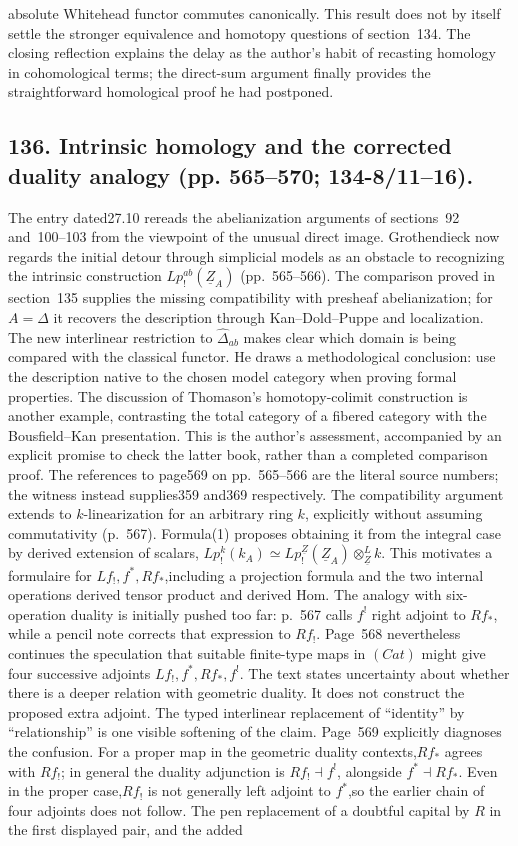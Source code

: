 \documentclass[10pt,oneside]{book}
\begin{document}
absolute Whitehead functor commutes canonically. This result does not by itself settle the stronger equivalence and homotopy questions of section~134. The closing reflection explains the delay as the author's habit of recasting homology in cohomological terms; the direct-sum argument finally provides the straightforward homological proof he had postponed.

\subsection*{136. Intrinsic homology and the corrected duality analogy (pp. 565--570; 134-8/11--16).}
The entry dated27.10 rereads the abelianization arguments of sections~92 and~100--103 from the viewpoint of the unusual direct image. Grothendieck now regards the initial detour through simplicial models as an obstacle to recognizing the intrinsic construction $Lp^{ab}_{!}(\underline Z_A)$ (pp.~565--566). The comparison proved in section~135 supplies the missing compatibility with presheaf abelianization; for $A=\Delta$ it recovers the description through Kan--Dold--Puppe and localization. The new interlinear restriction to $\widehat\Delta_{ab}$ makes clear which domain is being compared with the classical functor. He draws a methodological conclusion: use the description native to the chosen model category when proving formal properties. The discussion of Thomason's homotopy-colimit construction is another example, contrasting the total category of a fibered category with the Bousfield--Kan presentation. This is the author's assessment, accompanied by an explicit promise to check the latter book, rather than a completed comparison proof. The references to page569 on pp.~565--566 are the literal source numbers; the witness instead supplies359 and369 respectively. The compatibility argument extends to $k$-linearization for an arbitrary ring $k$, explicitly without assuming commutativity (p.~567). Formula(1) proposes obtaining it from the integral case by derived extension of scalars, $Lp^k_{!}(k_A)\simeq Lp^{\underline Z}_{!}(\underline Z_A)\otimes^{L}_{\underline Z}k$. This motivates a formulaire for $Lf_{!},f^*,Rf_*$,including a projection formula and the two internal operations derived tensor product and derived Hom. The analogy with six-operation duality is initially pushed too far: p.~567 calls $f^!$ right adjoint to $Rf_*$, while a pencil note corrects that expression to $Rf_!$. Page~568 nevertheless continues the speculation that suitable finite-type maps in $(Cat)$ might give four successive adjoints $Lf_!,f^*,Rf_*,f^!$. The text states uncertainty about whether there is a deeper relation with geometric duality. It does not construct the proposed extra adjoint. The typed interlinear replacement of ``identity'' by ``relationship'' is one visible softening of the claim. Page~569 explicitly diagnoses the confusion. For a proper map in the geometric duality contexts,$Rf_*$ agrees with $Rf_!$; in general the duality adjunction is $Rf_!\dashv f^!$, alongside $f^*\dashv Rf_*$. Even in the proper case,$Rf_!$ is not generally left adjoint to $f^*$,so the earlier chain of four adjoints does not follow. The pen replacement of a doubtful capital by $R$ in the first displayed pair, and the added 
\end{document}
